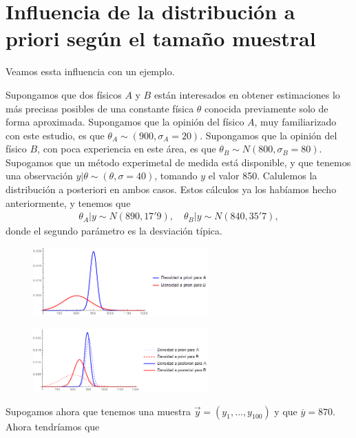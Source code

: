 \section{Influencia de la distribución a priori según el tamaño muestral}
\noindent Veamos essta influencia con un ejemplo.
\begin{ejemplo}
    Supongamos que dos físicos $A$ y $B$ están interesados en obtener estimaciones lo más precisas posibles de una constante física $\theta$ conocida previamente solo de forma aproximada. Supongamos que la opinión del físico $A$, muy familiarizado con este estudio, es que $\theta_A \sim (900, \sigma_A = 20)$. Supongamos que la opinión del físico $B$, con poca experiencia en este área, es que $\theta_B \sim N(800, \sigma_B = 80)$.
    \\
    \newline
    Supogamos que un método experimetal de medida está disponible, y que tenemos una observación $y | \theta \sim (\theta, \sigma=40)$, tomando $y$ el valor 850.  Calulemos la distribución a posteriori en ambos casos. Estos cálculos ya los habíamos hecho anteriormente, y tenemos que
    \begin{align*}
        \theta_A | y \sim N(890, 17'9), \quad \theta_B | y \sim N(840, 35'7),
    \end{align*}
    donde el segundo parámetro es la desviación típica.
\begin{figure}[H]
    \centering
    \includegraphics[width=0.6\textwidth]{imagenes4/apriori.png}
\end{figure}
\begin{figure}[H]
    \centering
    \includegraphics[width=0.6\textwidth]{imagenes4/aposte2.png}
\end{figure}
\noindent Supogamos ahora que tenemos una muestra $\vec{y} = (y_1,\ldots,y_{100})$ y que $\overline{y} = 870$. Ahora tendríamos que
    \begin{align*}

\end{align*}
\end{ejemplo}
